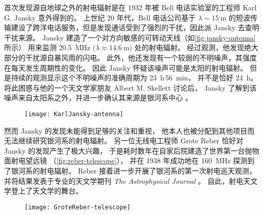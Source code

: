 首次发现源自地球之外的射电辐射是在 1932 年被 Bell 电话实验室的工程师
Karl G. Jansky 意外得到的。
上世纪 20 年代，Bell 电话公司基于 $\lambda \sim \SI{15}{\meter}$
的短波传输建设了跨洋电话服务，但是发现通话受到了强烈的干扰，因此派 Jansky 去查明干扰来源。
Jansky 建造了一个对方向敏感的可转动天线（如\autoref{fig:jansky-antenna} 所示）
用来监测 \SI{20.5}{\MHz} ($\lambda \approx \SI{14.6}{\meter}$) 处的射电辐射。
经过观测，他发现绝大部分的干扰源自暴风雨的闪电。
此外，他还发现有一个较弱的不明噪声，其强度在每天发生周期性的变化。
因此 Jansky 怀疑该噪声可能是太阳的射电辐射。
但是持续的观测显示这个不明噪声的准确周期为 \SI{23}{\hour}\,\SI{56}{\minute}，
并不是恰好 \SI{24}{\hour}。
将此困惑与他的一个天文学家朋友 Albert M. Skellett 讨论后，
Jansky 了解到该噪声来自太阳系之外，并进一步确认其来源是银河系中心 \cite{jansky1933}。

\begin{figure}[htp]
  \centering
  \texttt{[image: KarlJansky-antenna]}
  \label{fig:jansky-antenna}
\end{figure}

然而 Jansky 的发现未能得到足够的关注和重视，
他本人也被分配到其他项目而无法继续研究银河系的射电辐射。
另一位无线电工程师 Grote Reber 恰好对 Jansky 的发现产生了极大兴趣，
于是耗时数年在自家后院建造了世界第一台抛物面射电望远镜
（\autoref{fig:reber-telescope}），
并在 1938 年成功地在 \SI{160}{\MHz} 探测到了银河系的射电辐射。
Reber 接着进一步开展了银河系的第一次射电巡天观测，并将结果发表于专业的天文学期刊
\textit{The Astrophysical Journal} \cite{reber1940}。
自此，射电天文学登上了天文学的舞台。

\begin{figure}[htp]
  \centering
  \texttt{[image: GroteReber-telescope]}
  \label{fig:reber-telescope}
\end{figure}

